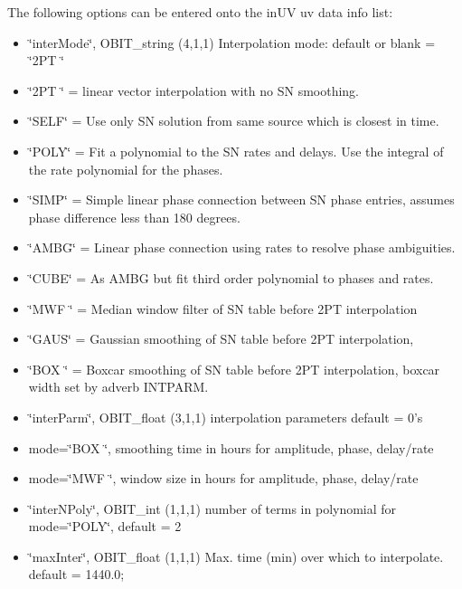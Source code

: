 The following options can be entered onto the in\-UV uv data info list: \begin{itemize}
\item \char`\"{}inter\-Mode\char`\"{}, OBIT\_\-string (4,1,1) Interpolation mode: default or blank = \char`\"{}2PT \char`\"{} \item \char`\"{}2PT \char`\"{} = linear vector interpolation with no SN smoothing. \item \char`\"{}SELF\char`\"{} = Use only SN solution from same source which is closest in time. \item \char`\"{}POLY\char`\"{} = Fit a polynomial to the SN rates and delays. Use the integral of the rate polynomial for the phases. \item \char`\"{}SIMP\char`\"{} = Simple linear phase connection between SN phase entries, assumes phase difference less than 180 degrees. \item \char`\"{}AMBG\char`\"{} = Linear phase connection using rates to resolve phase ambiguities. \item \char`\"{}CUBE\char`\"{} = As AMBG but fit third order polynomial to phases and rates. \item \char`\"{}MWF \char`\"{} = Median window filter of SN table before 2PT interpolation \item \char`\"{}GAUS\char`\"{} = Gaussian smoothing of SN table before 2PT interpolation, \item \char`\"{}BOX \char`\"{} = Boxcar smoothing of SN table before 2PT interpolation, boxcar width set by adverb INTPARM. \item \char`\"{}inter\-Parm\char`\"{}, OBIT\_\-float (3,1,1) interpolation parameters default = 0's \item mode=\char`\"{}BOX \char`\"{}, smoothing time in hours for amplitude, phase, delay/rate \item mode=\char`\"{}MWF \char`\"{}, window size in hours for amplitude, phase, delay/rate\end{itemize}
\begin{itemize}
\item \char`\"{}inter\-NPoly\char`\"{}, OBIT\_\-int (1,1,1) number of terms in polynomial for mode=\char`\"{}POLY\char`\"{}, default = 2\end{itemize}
\begin{itemize}
\item \char`\"{}max\-Inter\char`\"{}, OBIT\_\-float (1,1,1) Max. time (min) over which to interpolate. default = 1440.0;\end{itemize}

